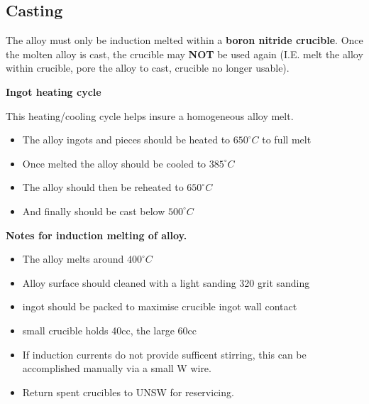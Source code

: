 \subsection{Casting}

The \MgZnCa alloy must only be induction melted within a \textbf{boron nitride crucible}. Once the molten alloy is cast, the crucible may \textbf{NOT} be used again (I.E. melt the alloy within crucible, pore the alloy to cast, crucible no longer usable). 

\textbf{Ingot heating cycle}

This heating/cooling cycle helps insure a homogeneous alloy melt.
\begin{itemize}
\item The \MgZnCa alloy ingots and pieces should be heated to $650^{\circ}C$ to full melt
\item Once melted the alloy should be cooled to $385^{\circ}C$
\item The alloy should then be reheated to $650^{\circ}C$
\item And finally should be cast below $500^{\circ}C$
\end{itemize}

\textbf{Notes for induction melting of \MgZnCa alloy.}
\begin{itemize}
\item The \MgZnCa alloy melts around $400^{\circ}C$
\item Alloy surface should cleaned with a light sanding 320 grit sanding
\item ingot should be packed to maximise crucible ingot wall contact
\item small crucible holds 40cc, the large 60cc
\item If induction currents do not provide sufficent stirring, this can be accomplished manually via a small W wire. 
\item Return spent crucibles to UNSW for reservicing. 
\end{itemize}